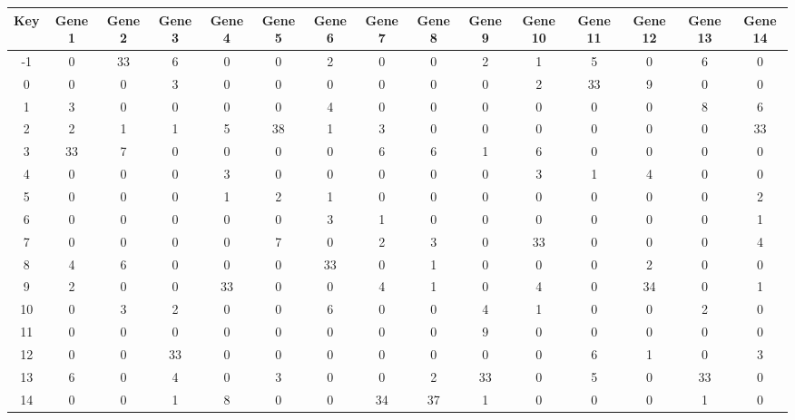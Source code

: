 \begin{tabular}{|c|c|c|c|c|c|c|c|c|c|c|c|c|c|c|}
\hline
Key & Gene 1 & Gene 2 & Gene 3 & Gene 4 & Gene 5 & Gene 6 & Gene 7 & Gene 8 & Gene 9 & Gene 10 & Gene 11 & Gene 12 & Gene 13 & Gene 14 \\
\hline
-1 & 0 & 33 & 6 & 0 & 0 & 2 & 0 & 0 & 2 & 1 & 5 & 0 & 6 & 0 \\
0 & 0 & 0 & 3 & 0 & 0 & 0 & 0 & 0 & 0 & 2 & 33 & 9 & 0 & 0 \\
1 & 3 & 0 & 0 & 0 & 0 & 4 & 0 & 0 & 0 & 0 & 0 & 0 & 8 & 6 \\
2 & 2 & 1 & 1 & 5 & 38 & 1 & 3 & 0 & 0 & 0 & 0 & 0 & 0 & 33 \\
3 & 33 & 7 & 0 & 0 & 0 & 0 & 6 & 6 & 1 & 6 & 0 & 0 & 0 & 0 \\
4 & 0 & 0 & 0 & 3 & 0 & 0 & 0 & 0 & 0 & 3 & 1 & 4 & 0 & 0 \\
5 & 0 & 0 & 0 & 1 & 2 & 1 & 0 & 0 & 0 & 0 & 0 & 0 & 0 & 2 \\
6 & 0 & 0 & 0 & 0 & 0 & 3 & 1 & 0 & 0 & 0 & 0 & 0 & 0 & 1 \\
7 & 0 & 0 & 0 & 0 & 7 & 0 & 2 & 3 & 0 & 33 & 0 & 0 & 0 & 4 \\
8 & 4 & 6 & 0 & 0 & 0 & 33 & 0 & 1 & 0 & 0 & 0 & 2 & 0 & 0 \\
9 & 2 & 0 & 0 & 33 & 0 & 0 & 4 & 1 & 0 & 4 & 0 & 34 & 0 & 1 \\
10 & 0 & 3 & 2 & 0 & 0 & 6 & 0 & 0 & 4 & 1 & 0 & 0 & 2 & 0 \\
11 & 0 & 0 & 0 & 0 & 0 & 0 & 0 & 0 & 9 & 0 & 0 & 0 & 0 & 0 \\
12 & 0 & 0 & 33 & 0 & 0 & 0 & 0 & 0 & 0 & 0 & 6 & 1 & 0 & 3 \\
13 & 6 & 0 & 4 & 0 & 3 & 0 & 0 & 2 & 33 & 0 & 5 & 0 & 33 & 0 \\
14 & 0 & 0 & 1 & 8 & 0 & 0 & 34 & 37 & 1 & 0 & 0 & 0 & 1 & 0 \\
\hline
\end{tabular}